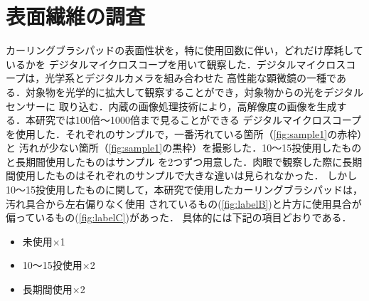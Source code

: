 \documentclass[main]{subfiles}
\begin{document}
\section{表面繊維の調査}

カーリングブラシパッドの表面性状を，特に使用回数に伴い，どれだけ摩耗しているかを
デジタルマイクロスコープを用いて観察した．デジタルマイクロスコープは，光学系とデジタルカメラを組み合わせた
高性能な顕微鏡の一種である．対象物を光学的に拡大して観察することができ，対象物からの光をデジタルセンサーに
取り込む．内蔵の画像処理技術により，高解像度の画像を生成する．本研究では100倍～1000倍まで見ることができる
デジタルマイクロスコープを使用した．それぞれのサンプルで，一番汚れている箇所（\ref{fig:sample1}の赤枠）と
汚れが少ない箇所（\ref{fig:sample1}の黒枠）を撮影した．10～15投使用したものと長期間使用したものはサンプル
を2つずつ用意した．肉眼で観察した際に長期間使用したものはそれぞれのサンプルで大きな違いは見られなかった．
しかし10～15投使用したものに関して，本研究で使用したカーリングブラシパッドは，汚れ具合から左右偏りなく使用
されているもの(\ref{fig:labelB})と片方に使用具合が偏っているもの(\ref{fig:labelC})があった．
具体的には下記の項目どおりである．

\begin{itemize}
    \item 未使用×1
    \item 10～15投使用×2
    \item 長期間使用×2
\end{itemize}
\end{document}
